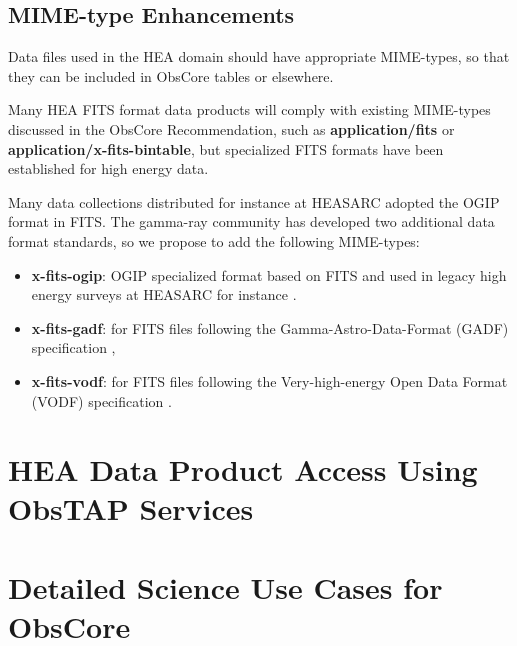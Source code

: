 \documentclass[11pt,a4paper]{ivoa}
\begin{document}
\subsection{MIME-type Enhancements}\label{sec:mimetypes}

Data files used in the \gls{HEA} domain should have appropriate MIME-types, so that they can be included in ObsCore tables or elsewhere.

Many \gls{HEA} FITS format data products will comply with existing MIME-types discussed in the ObsCore Recommendation, such as {\bf application/fits} or {\bf application/x-fits-bintable}, but specialized FITS formats have been established for high energy data. 

Many data collections distributed for instance at HEASARC adopted the OGIP format in FITS\null.
The gamma-ray community has developed two additional data format standards, so we propose to add the following MIME-types:

\begin{itemize}
\item {\bf x-fits-ogip}: OGIP specialized format based on FITS and used in legacy high energy surveys at HEASARC for instance \citep{ogip_Fits_event}.  
\item {\bf x-fits-gadf}: for FITS files following the Gamma-Astro-Data-Format (GADF) specification \citep{deil_2022_7304668},
\item {\bf x-fits-vodf}: for FITS files following the Very-high-energy Open Data Format (VODF) specification \citep{2023arXiv230813385K}.
\end{itemize}


\pagebreak
\section{\gls{HEA} Data Product Access Using ObsTAP Services}\label{sec:accessoptions}




\pagebreak



\appendix


\pagebreak
\section{Detailed Science Use Cases for ObsCore}
\label{sec:uc}


\end{document}
